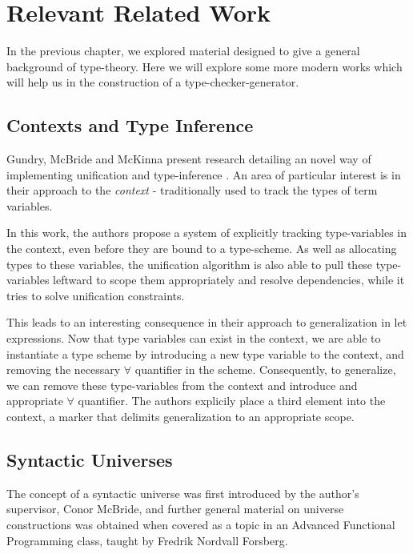\chapter{Relevant Related Work}

In the previous chapter, we explored material designed to give a
general background of type-theory. Here we will explore some more
modern works which will help us in the construction of a
type-checker-generator.

\section{Contexts and Type Inference}

Gundry, McBride and McKinna present research detailing an
novel way of implementing unification and
type-inference \cite{TypeInferenceInContext}. An area of
particular interest is in their approach to the
\emph{context} - traditionally used to track the types of
term variables.

In this work, the authors propose a system of explicitly
tracking type-variables in the context, even before they are
bound to a type-scheme. As well as allocating types
to these variables, the unification algorithm is also
able to pull these type-variables leftward to scope them
appropriately and resolve dependencies, while it tries to
solve unification constraints.

This leads to an interesting consequence in their approach to
generalization in let expressions. Now that type variables
can exist in the context, we are able to instantiate a type
scheme by introducing a new type variable to the context,
and removing the necessary $\forall$ quantifier in the
scheme. Consequently, to generalize, we can remove these
type-variables from the context and introduce and
appropriate $\forall$ quantifier. The authors explicily
place a third element into the context, a marker that delimits
generalization to an appropriate scope.

\section{Syntactic Universes}

The concept of a syntactic universe was first introduced by
the author's supervisor, Conor McBride, and further general
material on universe constructions was obtained when covered
as a topic in an Advanced Functional Programming class, taught
by Fredrik Nordvall Forsberg.

